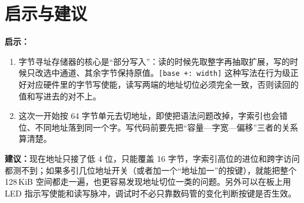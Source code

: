 \documentclass[12pt, a4paper]{ctexart}
\begin{document}
\section{启示与建议}

\textbf{启示：}
\begin{enumerate}
    \item 字节寻址存储器的核心是“部分写入”：读的时候先取整字再抽取扩展，写的时候只改选中通道、其余字节保持原值。\texttt{[base +: width]} 这种写法在行为级正好对应硬件里的字节写使能，读写两端的地址切位必须完全一致，否则读回的值和写进去的对不上。
    \item 这次一开始按 64 字节单元去切地址，即使把语法问题改掉，字索引也会错位、不同地址落到同一个字。写代码前要先把“容量—字宽—偏移”三者的关系算清楚。
\end{enumerate}

\textbf{建议：}现在地址只接了低 4 位，只能覆盖 16 字节，字索引高位的进位和跨字访问都测不到；如果多引几位地址开关（或者加一个“地址加一”的按键），就能把整个 128\,KiB 空间都走一遍，也更容易发现地址切位一类的问题。另外可以在板上用 LED 指示写使能和读写脉冲，调试时不必只靠数码管的变化判断按键是否生效。
\end{document}
